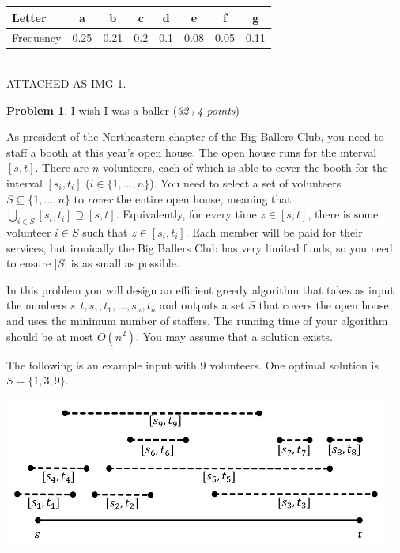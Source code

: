 \documentclass[11pt]{article}
\theoremstyle{definition}
\theoremstyle{theorem}
\newtheorem{prob}{Problem}
\newcommand{\solution}{\medskip\noindent{\color{DarkBlue}\textbf{Solution:}}}
\begin{document}
\begin{center}
\begin{tabular}{|l|c|c|c|c|c|c|c|}
\hline
Letter  & a & b & c & d & e & f & g \\
\hline
Frequency & 0.25 & 0.21 & 0.2 & 0.1 & 0.08 & 0.05 & 0.11 \\
\hline
\end{tabular}
\end{center}

\solution \\

ATTACHED AS IMG 1.

\newpage


\begin{prob} I wish I was a baller (\emph{32+4 points}) \end{prob}


As president of the Northeastern chapter of the Big Ballers Club, you need to staff a booth at this year's open house. The open house runs for the interval $[s,t]$.  There are $n$ volunteers, each of which is able to cover the booth for the interval $[s_i,t_i]$ ($i \in \{1, \dots, n\}$).  You need to select a set of volunteers $S \subseteq \{1,\dots,n\}$ to \emph{cover} the entire open house, meaning that $\bigcup_{i \in S} [s_i,t_i] \supseteq [s,t]$.  Equivalently, for every time $z \in [s,t]$, there is some volunteer $i \in S$ such that $z \in [s_i, t_i]$.  Each member will be paid for their services, but ironically the Big Ballers Club has very limited funds, so you need to ensure $|S|$ is as small as possible.

In this problem you will design an efficient greedy algorithm that takes as input the numbers $s,t,s_1,t_1,\dots,s_n,t_n$ and outputs a set $S$ that covers the open house and uses the minimum number of staffers.  The running time of your algorithm should be at most $O(n^2)$. You may assume that a solution exists.

\bigskip
The following is an example input with $9$ volunteers.  One optimal solution is $S = \{ 1,3,9 \}$.

\begin{center}
\includegraphics[width=5in]{hw4-fig1.jpg}
\end{center}
\end{document}
